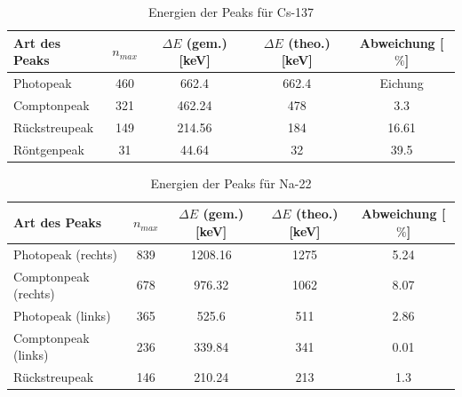 \documentclass[a4paper,titlepage]{scrartcl}
\numberwithin{equation}{section}
\begin{document}
\begin{table}[H]
\begin{tabular}{l|c|c|c|c}
	Art des Peaks & $n_{max}$ & $\Delta E$ (gem.) [keV] & $\Delta E$ (theo.) [keV] & Abweichung [$\%$] \\
	\hline
	Photopeak & 460 & 662.4 & 662.4 & Eichung\\
	Comptonpeak & 321 & 462.24 & 478 & 3.3\\
	Rückstreupeak & 149 & 214.56 & 184 & 16.61\\
	Röntgenpeak & 31 & 44.64 & 32 & 39.5\\
\end{tabular}
\caption{Energien der Peaks für Cs-137}
\end{table}

\begin{table}[H]
\begin{tabular}{l|c|c|c|c}
	Art des Peaks & $n_{max}$ & $\Delta E$ (gem.) [keV] & $\Delta E$ (theo.) [keV] & Abweichung [$\%$] \\
	\hline
	Photopeak (rechts) & 839 & 1208.16 & 1275 & 5.24\\
	Comptonpeak (rechts) & 678 & 976.32 & 1062 & 8.07\\
	Photopeak (links) & 365 & 525.6 & 511 & 2.86\\
	Comptonpeak (links) & 236 & 339.84 & 341 & 0.01\\
	Rückstreupeak & 146 & 210.24 & 213 & 1.3\\
\end{tabular}
\caption{Energien der Peaks für Na-22}
\end{table}
\end{document}
